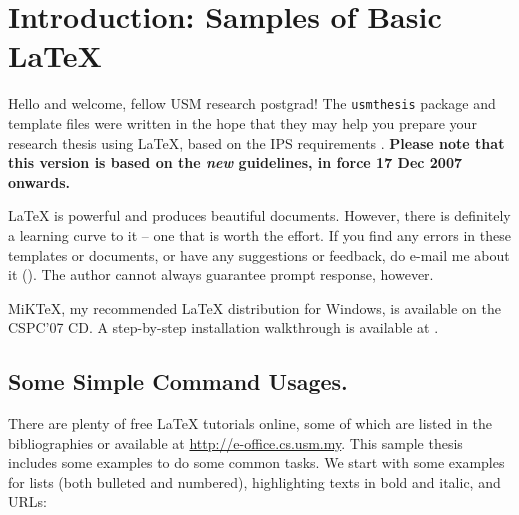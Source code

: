 \chapter{Introduction: Samples of Basic \LaTeX{}}\label{chap:intro}

Hello and welcome, fellow \ac{USM} research postgrad!  The \verb|usmthesis| package and template files were written in the hope that they may help you prepare your research thesis using \LaTeX, based on the \ac{IPS} requirements \citep{ips:thesis:guideline:2007}. \textbf{Please note that this version is based on the \emph{new} guidelines, in force 17 Dec 2007 onwards.}

\LaTeX{} is powerful and produces beautiful documents.  However, there is definitely a learning curve to it -- one that is worth the effort.  %
If you find any errors in these templates or documents, or have any suggestions or feedback, do e-mail me about it ().  The author cannot always guarantee prompt response, however. \Smiley

MiK\TeX{}, my recommended \LaTeX{} distribution for Windows, is available on the CSPC'07 CD. A step-by-step installation walkthrough is available at \citep{lim:latextypesetting}.

\section{Some Simple Command Usages.}

There are plenty of free \LaTeX{} tutorials online, some of which are listed in the bibliographies or available at \url{http://e-office.cs.usm.my}.  This sample thesis includes some examples to do some common tasks.  We start with some examples for lists (both bulleted and numbered), highlighting texts in bold and italic, and URLs:


